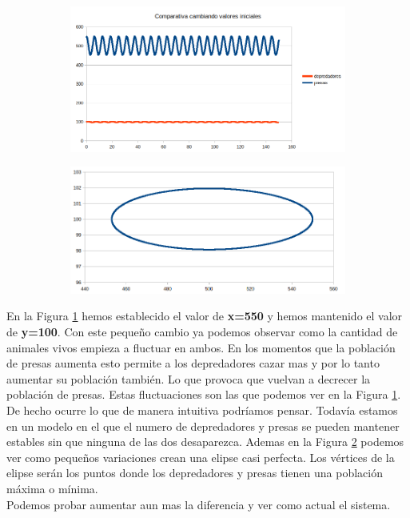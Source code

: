 \documentclass[12pt,a4paper]{article}
\begin{document}
\begin{figure}[H]
	\centering
	\begin{subfigure}{.5\textwidth}
		\centering
	\includegraphics[width=1\linewidth]{images/ejercicio2_2}
		\caption{}
			\label{fig:ejercicio221}

	\end{subfigure}%
	\begin{subfigure}{.5\textwidth}
		\centering
 	\includegraphics[width=1\linewidth]{images/ejercicio2_3_3}
		\caption{}
 	\label{fig:ejercicio233}
	\end{subfigure}

	\label{fig:ejercicio22}
\end{figure}
En la Figura \ref{fig:ejercicio221} hemos establecido el valor de \textbf{x=550} y hemos mantenido el valor de \textbf{y=100}. Con este pequeño cambio ya podemos observar como la cantidad de animales vivos empieza a fluctuar en ambos. En los momentos que la población de presas aumenta esto permite a los depredadores cazar mas y por lo tanto aumentar su población también. Lo que provoca que vuelvan a decrecer la población de presas. Estas fluctuaciones son las que podemos ver en la Figura \ref{fig:ejercicio221}. De hecho ocurre lo que de manera intuitiva podríamos pensar. Todavía estamos en un modelo en el que el numero de depredadores y presas se pueden mantener estables sin que ninguna de las dos desaparezca. Ademas en la Figura \ref{fig:ejercicio233} podemos ver como pequeños variaciones crean una elipse casi perfecta. Los vértices de la elipse serán los puntos donde los depredadores y presas tienen una población máxima o mínima. 
\\Podemos probar aumentar aun mas la diferencia y ver como actual el sistema. 
\end{document}
